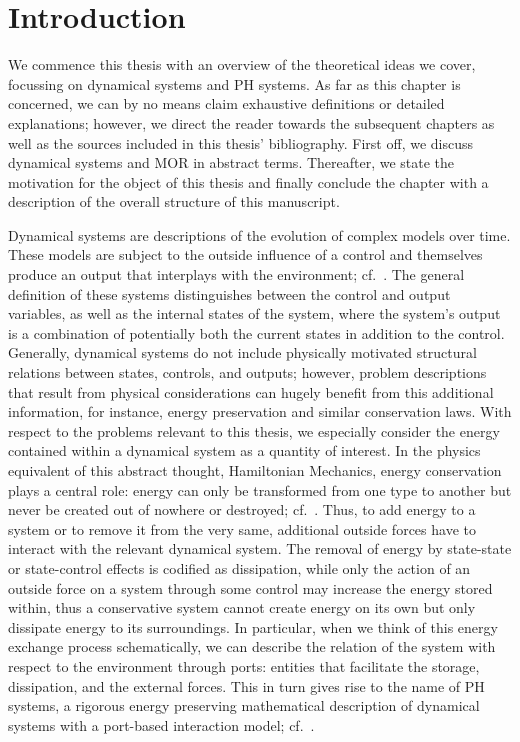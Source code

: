 \chapter{Introduction}\label{chap:introduction}

We commence this thesis with an overview of the theoretical ideas we cover, focussing on dynamical systems and \ac{PH} systems.
As far as this chapter is concerned, we can by no means claim exhaustive definitions or detailed explanations; however, we direct the reader towards the subsequent chapters as well as the sources included in this thesis' bibliography.
First off, we discuss dynamical systems and \ac{MOR} in abstract terms.
Thereafter, we state the motivation for the object of this thesis and finally conclude the chapter with a description of the overall structure of this manuscript.

Dynamical systems are descriptions of the evolution of complex models over time.
These models are subject to the outside influence of a control and themselves produce an output that interplays with the environment; cf.~\cite{Hinrichsen2005}.
The general definition of these systems distinguishes between the control and output variables, as well as the internal states of the system, where the system's output is a combination of potentially both the current states in addition to the control.
Generally, dynamical systems do not include physically motivated structural relations between states, controls, and outputs; however, problem descriptions that result from physical considerations can hugely benefit from this additional information, for instance, energy preservation and similar conservation laws.
With respect to the problems relevant to this thesis, we especially consider the energy contained within a dynamical system as a quantity of interest.
In the physics equivalent of this abstract thought, Hamiltonian Mechanics, energy conservation plays a central role: energy can only be transformed from one type to another but never be created out of nowhere or destroyed; cf.~\cite{Taylor2005, Giorgilli2022}.
Thus, to add energy to a system or to remove it from the very same, additional outside forces have to interact with the relevant dynamical system.
The removal of energy by state-state or state-control effects is codified as dissipation, while only the action of an outside force on a system through some control may increase the energy stored within, thus a conservative system cannot create energy on its own but only dissipate energy to its surroundings.
In particular, when we think of this energy exchange process schematically, we can describe the relation of the system with respect to the environment through ports: entities that facilitate the storage, dissipation, and the external forces.
This in turn gives rise to the name of \ac{PH} systems, a rigorous energy preserving mathematical description of dynamical systems with a port-based interaction model; cf.~\cite{Duindam2009, Jacob2012, VanDerSchaft2014, Mehrmann2023}.

